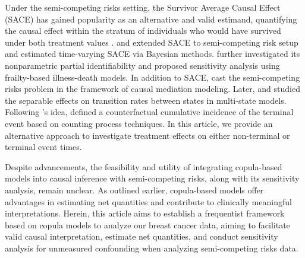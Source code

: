 \documentclass[APA,Times1COL]{WileyNJDv5} %
\theoremstyle{plain}
\begin{document}
Under the semi-competing risks setting, the Survivor Average Causal Effect (SACE) has gained popularity as an alternative and valid estimand, quantifying the causal effect within the stratum of individuals who would have survived under both treatment values \citep{frangakis2002principal}. \cite{comment2019survivor} and \cite{xu2022bayesian} extended SACE to semi-competing risk setup and estimated time-varying SACE via Bayesian methods. \cite{Nevo2022semicompeting} further investigated its nonparametric partial identifiability and proposed sensitivity analysis using frailty-based illness-death models. In addition to SACE, \cite{huang2021causal} cast the semi-competing risks problem in the framework of causal mediation modeling. Later, \cite{deng2023separable} and \cite{breum2024} studied the separable effects on transition rates between states in multi-state models. Following \cite{huang2021causal}'s idea, \cite{deng2024direct} defined a counterfactual cumulative incidence of the terminal event based on counting process techniques. In this article, we provide an alternative approach to investigate treatment effects on either non-terminal or terminal event times.

Despite advancements, the feasibility and utility of integrating copula-based models into causal inference with semi-competing risks, along with its sensitivity analysis, remain unclear. As outlined earlier, copula-based models offer advantages in estimating net quantities and contribute to clinically meaningful interpretations. Herein, this article aims to establish a frequentist framework based on copula models to analyze our breast cancer data, aiming to facilitate valid causal interpretation, estimate net quantities, and conduct sensitivity analysis for unmeasured confounding when analyzing semi-competing risks data.  



\end{document}
